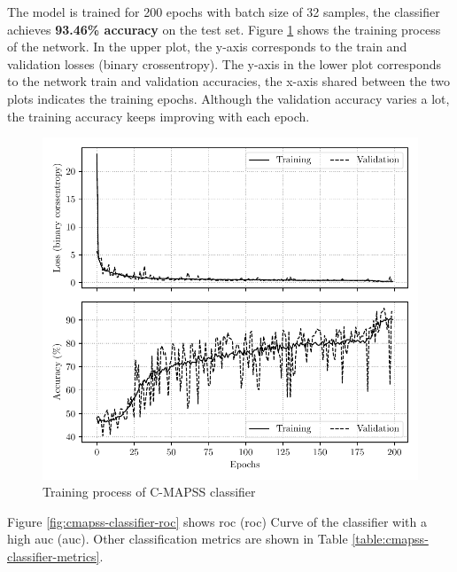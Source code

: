 The model is trained for 200 epochs with batch size of 32 samples, the classifier achieves \textbf{93.46\% accuracy} on the test set. Figure \ref{fig:cmapss-classifier-training} shows the training process of the network. In the upper plot, the y-axis corresponds to the train and validation losses (binary crossentropy). The y-axis in the lower plot corresponds to the network train and validation accuracies, the x-axis shared between the two plots indicates the training epochs. Although the validation accuracy varies a lot, the training accuracy keeps improving with each epoch.

\begin{figure}[H]
    \centering
    \includegraphics{figures/cmapss_classification_training.pdf}
    \caption{Training process of C-MAPSS classifier}
    \label{fig:cmapss-classifier-training}
\end{figure}

Figure \ref{fig:cmapss-classifier-roc} shows \acrlong{roc} (\acrshort{roc}) Curve of the classifier with a high \acrlong{auc} (\acrshort{auc}). Other classification metrics are shown in Table \ref{table:cmapss-classifier-metrics}.

